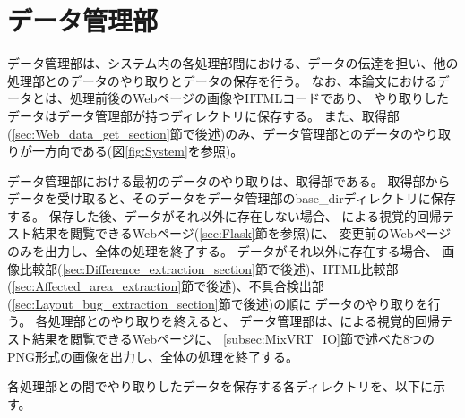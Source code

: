 \section{データ管理部}\label{sec:data_admin_section}
データ管理部は、システム内の各処理部間における、データの伝達を担い、他の処理部とのデータのやり取りとデータの保存を行う。
なお、本論文におけるデータとは、処理前後のWebページの画像やHTMLコードであり、
やり取りしたデータはデータ管理部が持つディレクトリに保存する。
また、取得部(\ref{sec:Web_data_get_section}節で後述)のみ、データ管理部とのデータのやり取りが一方向である(図\ref{fig:System}を参照)。
\par
データ管理部における最初のデータのやり取りは、取得部である。
取得部からデータを受け取ると、そのデータをデータ管理部のbase\_dirディレクトリに保存する。
保存した後、データがそれ以外に存在しない場合、
\toolName による視覚的回帰テスト結果を閲覧できるWebページ(\ref{sec:Flask}節を参照)に、
変更前のWebページのみを出力し、全体の処理を終了する。
データがそれ以外に存在する場合、
画像比較部(\ref{sec:Difference_extraction_section}節で後述)、HTML比較部(\ref{sec:Affected_area_extraction}節で後述)、不具合検出部(\ref{sec:Layout_bug_extraction_section}節で後述)の順に
データのやり取りを行う。
各処理部とのやり取りを終えると、
データ管理部は、\toolName による視覚的回帰テスト結果を閲覧できるWebページに、
\ref{subsec:MixVRT_IO}節で述べた8つのPNG形式の画像を出力し、全体の処理を終了する。
\par
各処理部との間でやり取りしたデータを保存する各ディレクトリを、以下に示す。
